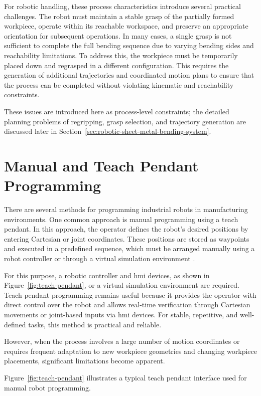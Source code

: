 For robotic handling, these process characteristics introduce several practical challenges. The robot must maintain a stable grasp of the partially formed workpiece, operate within its reachable workspace, and preserve an appropriate orientation for subsequent operations. In many cases, a single grasp is not sufficient to complete the full bending sequence due to varying bending sides and reachability limitations. To address this, the workpiece must be temporarily placed down and regrasped in a different configuration. This requires the generation of additional trajectories and coordinated motion plans to ensure that the process can be completed without violating kinematic and reachability constraints.

These issues are introduced here as process-level constraints; the detailed planning problems of regripping, grasp selection, and trajectory generation are discussed later in Section~\ref{sec:robotic-sheet-metal-bending-system}.

\section{Manual and Teach Pendant Programming}
\label{sec:manual-teach-pendant-programming}

There are several methods for programming industrial robots in manufacturing environments. One common approach is manual programming using a teach pendant. In this approach, the operator defines the robot's desired positions by entering Cartesian or joint coordinates. These positions are stored as waypoints and executed in a predefined sequence, which must be arranged manually using a robot controller or through a virtual simulation environment \cite{Siciliano2016Robotics}.

For this purpose, a robotic controller and \ac{hmi} devices, as shown in Figure~\ref{fig:teach-pendant}, or a virtual simulation environment are required. Teach pendant programming remains useful because it provides the operator with direct control over the robot and allows real-time verification through Cartesian movements or joint-based inputs via \acs{hmi} devices. For stable, repetitive, and well-defined tasks, this method is practical and reliable.

However, when the process involves a large number of motion coordinates or requires frequent adaptation to new workpiece geometries and changing workpiece placements, significant limitations become apparent.

Figure~\ref{fig:teach-pendant} illustrates a typical teach pendant interface used for manual robot programming.

